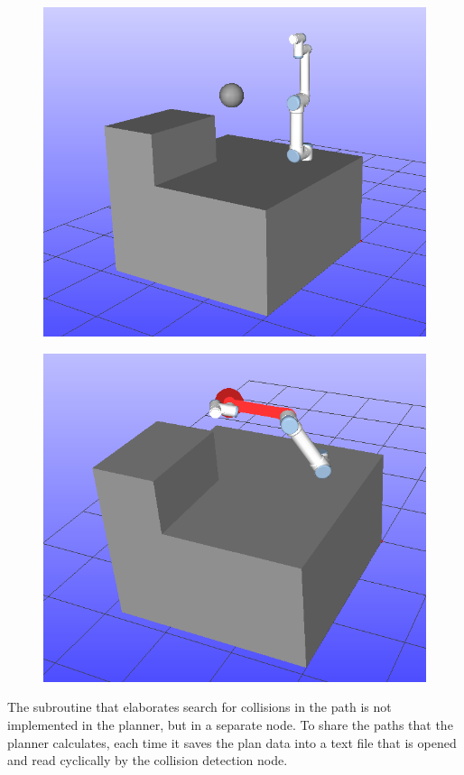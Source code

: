 \begin{figure}[ht!]
\centering
\begin{minipage}{.5\textwidth}
  \centering
  \includegraphics[width=.8\linewidth]{Images/wc1.png}
  \label{fig:wc1}
\end{minipage}%
\begin{minipage}{.5\textwidth}
  \centering
  \includegraphics[width=.8\linewidth]{Images/wc2.png}
  \label{fig:wc2}
\end{minipage}
\end{figure}

The subroutine that elaborates search for collisions in the path is not implemented in the planner, but in a separate node. To share the paths that the planner calculates, each time it saves the plan data into a text file that is opened and read cyclically by the collision detection node.\\

